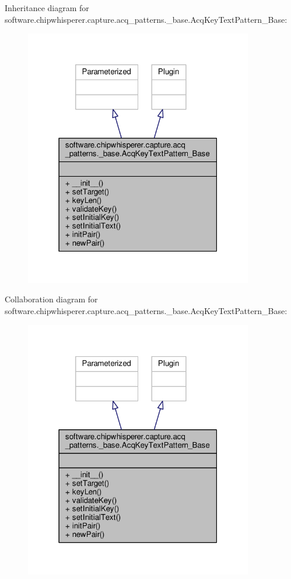 Inheritance diagram for software.\+chipwhisperer.\+capture.\+acq\+\_\+patterns.\+\_\+base.\+Acq\+Key\+Text\+Pattern\+\_\+\+Base\+:\nopagebreak
\begin{figure}[H]
\begin{center}
\leavevmode
\includegraphics[width=283pt]{da/d0d/classsoftware_1_1chipwhisperer_1_1capture_1_1acq__patterns_1_1__base_1_1AcqKeyTextPattern__Base__inherit__graph}
\end{center}
\end{figure}


Collaboration diagram for software.\+chipwhisperer.\+capture.\+acq\+\_\+patterns.\+\_\+base.\+Acq\+Key\+Text\+Pattern\+\_\+\+Base\+:\nopagebreak
\begin{figure}[H]
\begin{center}
\leavevmode
\includegraphics[width=283pt]{dc/dc8/classsoftware_1_1chipwhisperer_1_1capture_1_1acq__patterns_1_1__base_1_1AcqKeyTextPattern__Base__coll__graph}
\end{center}
\end{figure}


